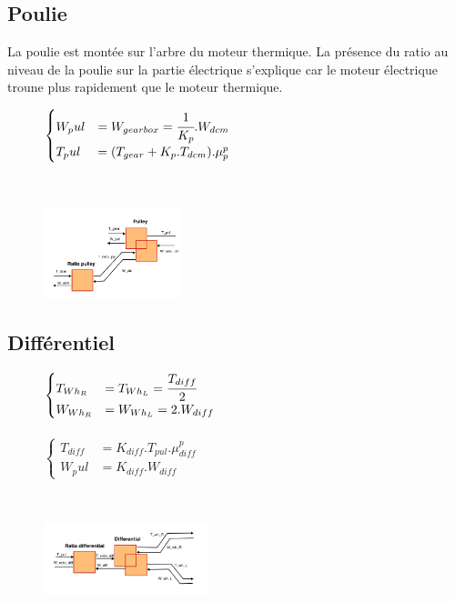 \newpage
\subsection{Poulie}
La poulie est montée sur l'arbre du moteur thermique. La présence du ratio au niveau de la poulie sur la partie électrique s'explique car le moteur électrique troune plus rapidement que le moteur thermique. 
\vspace{-20px}
\begin{figure}[ht]
\centering
\begin{minipage}{.5\textwidth}  
\centering
$\begin{cases}
	W_pul &= W_{gearbox} = \cfrac{1}{K_p}.W_{dcm} \\
	T_pul &= (T_{gear}+K_p.T_{dcm}).\mu{}_p^{p}
\end{cases}$
\end{minipage}~
\begin{minipage}{.5\textwidth}
  \centering
\includegraphics[height=100px]{images/Pulley.png}
\end{minipage}
\end{figure}
\FloatBarrier
\vspace{-30px}

\subsection{Différentiel}

\vspace{-0px}
\begin{figure}[ht]
\centering
\begin{minipage}{.5\textwidth}  
\centering
$\begin{cases}
	T_{Wh_R} &= T_{Wh_L} = \cfrac{T_{diff}}{2} \\
	W_{Wh_R} &= W_{Wh_L} = 2.W_{diff}
\end{cases}$\\
~\\
$\begin{cases}
	 T_{diff} &= K_{diff}.T_{pul}.\mu{}_{diff}^{p}\\
	W_pul &= K_{diff}.W_{diff}
\end{cases}$
\end{minipage}~
\begin{minipage}{.5\textwidth}
  \centering
\includegraphics[height=80px]{images/Differential.png}
\end{minipage}
\end{figure}
\FloatBarrier
\vspace{-10px}

